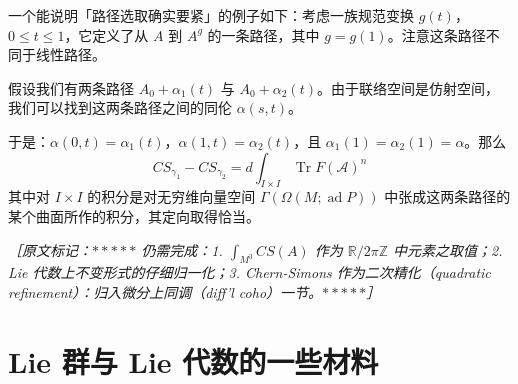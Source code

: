
一个能说明「路径选取确实要紧」的例子如下：考虑一族规范变换 $g(t)$，$0\le t\le 1$，它定义了从 $A$ 到 $A^g$ 的一条路径，其中 $g=g(1)$。注意这条路径不同于线性路径。

假设我们有两条路径 $A_0+\alpha_1(t)$ 与 $A_0+\alpha_2(t)$。由于联络空间是仿射空间，我们可以找到这两条路径之间的同伦 $\alpha(s,t)$。

于是：$\alpha(0,t)=\alpha_1(t)$，$\alpha(1,t)=\alpha_2(t)$，且 $\alpha_1(1)=\alpha_2(1)=\alpha$。那么
\begin{equation}
CS_{\gamma_1}-CS_{\gamma_2}=d\int_{I\times I}\operatorname{Tr}F(\mathcal{A})^n
\tag{I.59}
\label{eq:I.59}
\end{equation}
其中对 $I\times I$ 的积分是对无穷维向量空间 $\Gamma(\Omega(M;\operatorname{ad}P))$ 中张成这两条路径的某个曲面所作的积分，其定向取得恰当。


{\small\itshape ［原文标记：$\ast\ast\ast\ast\ast$ 仍需完成：1. $\int_{M^3}CS(A)$ 作为 $\mathbb{R}/2\pi\mathbb{Z}$ 中元素之取值；2. Lie 代数上不变形式的仔细归一化；3. Chern-Simons 作为二次精化（quadratic refinement）：归入微分上同调（diff'l coho）一节。$\ast\ast\ast\ast\ast$］}

\section{Lie 群与 Lie 代数的一些材料} %

